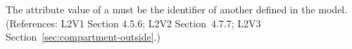 The  attribute value of a \Compartment must be the identifier of
another \Compartment defined in the model.  (References: L2V1 Section
4.5.6; L2V2 Section~4.7.7; L2V3 Section~\ref{sec:compartment-outside}.)
